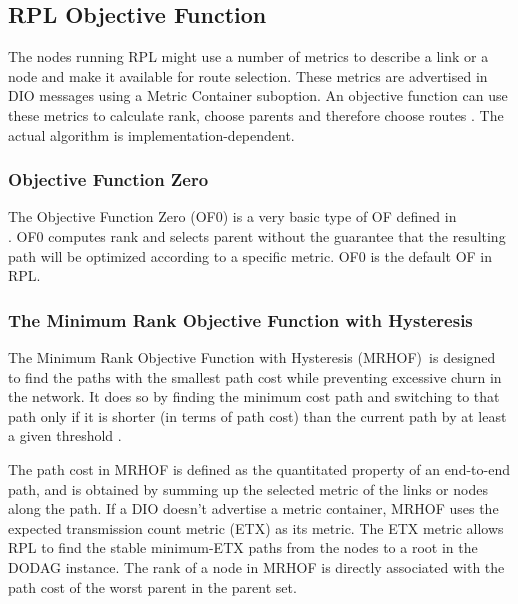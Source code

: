 \subsection{RPL Objective Function}
\label{RPL:OF}
The nodes running RPL might use a number of metrics to describe a link or a node and make it available for route selection. These metrics are advertised in DIO messages using a Metric Container suboption. An objective function can use these metrics to calculate rank, choose parents and therefore choose routes \cite{MRHOF}. The actual algorithm is implementation-dependent.

\subsubsection{Objective Function Zero}
\label{RPL:OF0}
The Objective Function Zero (OF0) is a very basic type of OF defined in \\ \cite{draft-ietf-roll-of0-19}. OF0 computes rank and selects parent without the guarantee that the resulting path will be optimized according to a specific metric. OF0 is the default OF in RPL.
 
\subsubsection{The Minimum Rank Objective Function with Hysteresis}
\label{RPL:MRHOF}
The Minimum Rank Objective Function with Hysteresis (MRHOF)\, is designed to find the paths with the smallest path cost while preventing excessive churn in the network. It does so by finding the minimum cost path and switching to that path only if it is shorter (in terms of path cost) than the current path by at least a given threshold \cite{MRHOF}. 
\newline

The path cost in MRHOF is defined as the quantitated property of an end-to-end path, and is obtained by summing up the selected metric of the links or nodes along the path. If a DIO doesn't advertise a metric container, MRHOF uses the expected transmission count metric (ETX) as its metric. The ETX metric allows RPL to find the stable minimum-ETX paths from the nodes to a root in the DODAG instance. The rank of a node in MRHOF is directly associated with the path cost of the worst parent in the parent set.

